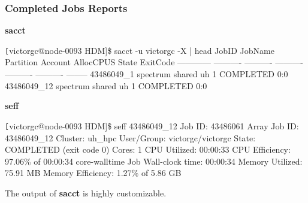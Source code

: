 \begin{frame}[fragile]
\frametitle{Completed Jobs Reports}
\begin{block}{\textbf{sacct}}
\begin{semiverbatim}\tiny \texttt
[victorgc@node-0093 HDM]\$ sacct -u victorgc -X | head
JobID           JobName  Partition    Account  AllocCPUS      State ExitCode
------------ ---------- ---------- ---------- ---------- ---------- --------
43486049_1     spectrum     shared         uh          1  COMPLETED      0:0
43486049_12    spectrum     shared         uh          1  COMPLETED      0:0
\end{semiverbatim}
\end{block}
\begin{block}{\textbf{seff}}
\begin{semiverbatim}\tiny \texttt
[victorgc@node-0093 HDM]\$ seff 43486049_12
Job ID: 43486061
Array Job ID: 43486049_12
Cluster: uh_hpc
User/Group: victorgc/victorgc
State: COMPLETED (exit code 0)
Cores: 1
CPU Utilized: 00:00:33
CPU Efficiency: 97.06\% of 00:00:34 core-walltime
Job Wall-clock time: 00:00:34
Memory Utilized: 75.91 MB
Memory Efficiency: 1.27\% of 5.86 GB
\end{semiverbatim}
\end{block}
The output of \textbf{sacct} is highly customizable.

\end{frame}

